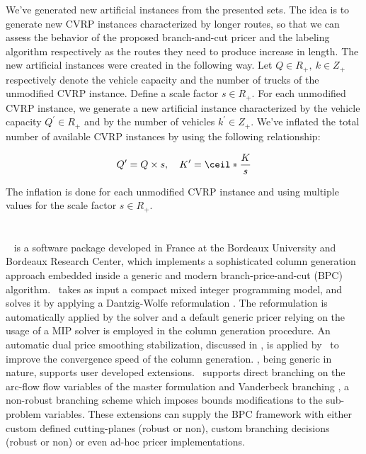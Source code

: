 \medskip

We've generated new artificial instances from the presented sets.
The idea is to generate new CVRP instances characterized by longer routes,
so that we can assess the behavior of the proposed branch-and-cut pricer
and the labeling algorithm respectively as the routes
they need to produce increase in length.
The new artificial instances were created in the following way.
Let $Q \in R_+,\ k \in Z_+$ respectively denote the vehicle
capacity and the number of trucks of the unmodified CVRP instance.
Define a scale factor $s \in R_+$.
For each unmodified CVRP instance, we generate a new artificial instance
characterized by the vehicle capacity $Q^\prime \in R_+$
and by the number of vehicles $k^\prime \in Z_+$.
We've inflated the total number of available CVRP instances
by using the following relationship:

$$
	Q^\prime = Q \times s, \quad K^\prime = \ceil*{\frac{K}{s}}
$$

The inflation is done for each unmodified CVRP instance and using
multiple values for the scale factor $s \in R_+$.

\section{\bapcod}
\label{sec:results-bapcod}

\textit{\bapcod}\ \parencite{sadykov2021} is a software package
developed in France at the Bordeaux University and Bordeaux Research Center,
which implements a sophisticated column generation approach
embedded inside a generic and modern branch-price-and-cut (BPC) algorithm.
\bapcod\ takes as input a compact mixed integer programming model,
and solves it by applying a Dantzig-Wolfe reformulation \parencite{dantzig1960}.
The reformulation is automatically applied by the solver
and a default generic pricer relying on
the usage of a MIP solver is employed in the column generation procedure.
An automatic dual price smoothing stabilization, discussed in \textcite{pessoa2018automation},
is applied by \bapcod\ to improve the convergence speed of the column generation.
\bapcod, being generic in nature,
supports user developed extensions.
\bapcod\ supports direct branching on the arc-flow flow variables of the master formulation
and Vanderbeck branching \parencite{vanderbeck2011}, a non-robust branching
scheme which imposes bounds modifications to the sub-problem variables.
These extensions can supply the BPC framework with either
custom defined cutting-planes (robust or non), custom branching decisions (robust or non)
or even ad-hoc pricer implementations.

